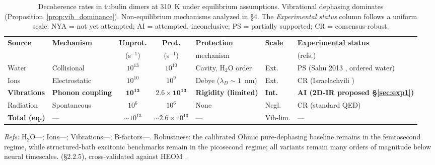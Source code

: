 \documentclass[twocolumn,10pt]{article}
\begin{document}
\begin{table}[t]
\centering
\caption{Decoherence rates in tubulin dimers at 310~K under equilibrium
assumptions. Vibrational dephasing dominates
(Proposition~\ref{prop:vib_dominance}). Non-equilibrium mechanisms analyzed
in \S 4. The \emph{Experimental status} column follows a uniform scale:
NYA = not yet attempted; AI = attempted, inconclusive; PS = partially
supported; CR = consensus-robust.}
\label{tab:decoherence_rates}
\footnotesize
\begin{tabular}{p{2.0cm}p{2.2cm}ccp{2.4cm}p{1.5cm}p{3.2cm}}
\toprule
\textbf{Source} & \textbf{Mechanism} & \textbf{Unprot.} & \textbf{Prot.}
& \textbf{Protection} & \textbf{Scale} & \textbf{Experimental status} \\
& & (s$^{-1}$) & (s$^{-1}$) & mechanism & & (refs.) \\
\midrule
Water & Collisional & $10^{13}$ & $10^{10}$ & Cavity, H$_2$O order & Ext. &
PS (Sahu 2013 \cite{Sahu2013}, ordered water) \\
\addlinespace
Ions & Electrostatic & $10^{10}$ & $10^9$ & Debye ($\lambda_D \sim 1$~nm) &
Ext. & CR (Israelachvili \cite{Israelachvili2011}) \\
\addlinespace
\textbf{Vibrations} & \textbf{Phonon coupling} & $\mathbf{10^{13}}$ &
$\mathbf{2.6\times 10^{13}}$ & \textbf{Rigidity (limited)} &
\textbf{Int.} & \textbf{AI (2D-IR proposed \S\ref{sec:exp1})} \\
\addlinespace
Radiation & Spontaneous & $10^6$ & $10^6$ & None & Negl. & CR (standard QED) \\
\midrule
\textbf{Total (eq.)} & --- & $\sim 10^{13}$ & $\sim 2.6\times 10^{13}$ & --- &
Vib-lim. & --- \\
\bottomrule
\end{tabular}
\vspace{0.2cm}
\footnotesize
\textit{Refs:} H$_2$O---\cite{Eaves2005}; Ions---\cite{Israelachvili2011,Xiang2019};
Vibrations---\cite{May2011,Rego2003,Weiss2008}; B-factors---\cite{Nogales1998}.
Robustness: the calibrated Ohmic pure-dephasing baseline remains in the
femtosecond regime, while structured-bath excitonic benchmarks remain in the
picosecond regime; all variants remain many orders of magnitude below neural
timescales. (\S 2.2.5), cross-validated against HEOM
\cite{Ishizaki2009}.
\end{table}

\end{document}
